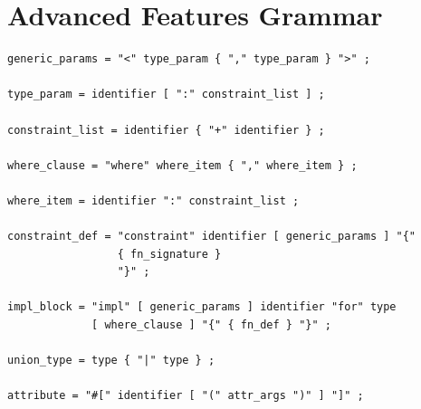 \section{Advanced Features Grammar}

\begin{lstlisting}[language=EBNF]
generic_params = "<" type_param { "," type_param } ">" ;

type_param = identifier [ ":" constraint_list ] ;

constraint_list = identifier { "+" identifier } ;

where_clause = "where" where_item { "," where_item } ;

where_item = identifier ":" constraint_list ;

constraint_def = "constraint" identifier [ generic_params ] "{"
                 { fn_signature }
                 "}" ;

impl_block = "impl" [ generic_params ] identifier "for" type
             [ where_clause ] "{" { fn_def } "}" ;

union_type = type { "|" type } ;

attribute = "#[" identifier [ "(" attr_args ")" ] "]" ;
\end{lstlisting}
